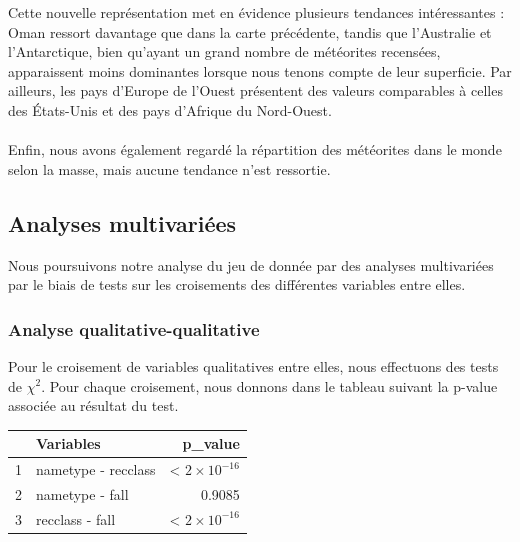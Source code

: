\documentclass[12pt]{article}
\begin{document}
Cette nouvelle représentation met en évidence plusieurs tendances intéressantes : Oman ressort davantage que dans la carte précédente, tandis que l’Australie et l’Antarctique, bien qu’ayant un grand nombre de météorites recensées, apparaissent moins dominantes lorsque nous tenons compte de leur superficie. Par ailleurs, les pays d’Europe de l’Ouest présentent des valeurs comparables à celles des États-Unis et des pays d’Afrique du Nord-Ouest.\\
\\
Enfin, nous avons également regardé la répartition des météorites dans le monde selon la masse, mais aucune tendance n'est ressortie.

\subsection{Analyses multivariées}
Nous poursuivons notre analyse du jeu de donnée par des analyses multivariées par le biais de tests sur les croisements des différentes variables entre elles.
\subsubsection*{Analyse qualitative-qualitative}
Pour le croisement de variables qualitatives entre elles, nous effectuons des tests de $\chi^2$. Pour chaque croisement, nous donnons dans le tableau suivant la p-value associée au résultat du test.
\begin{table}[H]
\centering
\begin{tabular}{rlr}
  \hline
 & Variables & p\_value \\ 
  \hline
1 & nametype - recclass & < $2\times 10^{-16}$  \\ 
  2 & nametype - fall & 0.9085 \\ 
  3 & recclass - fall & < $2\times 10^{-16}$  \\ 
   \hline
\end{tabular}
\end{table}
\end{document}
